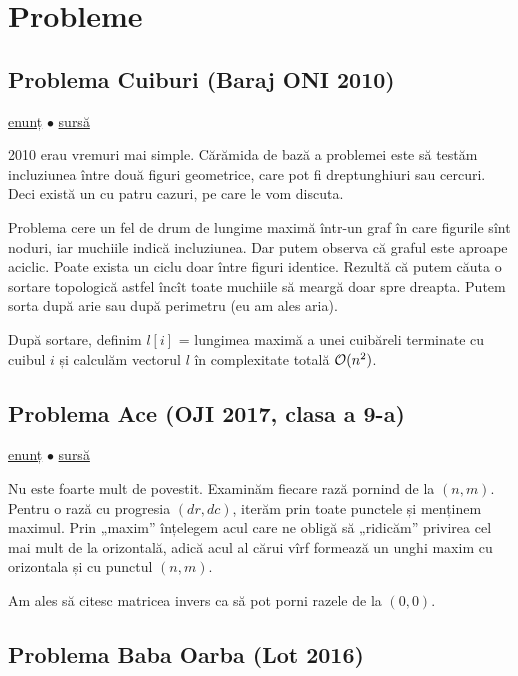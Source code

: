 \documentclass[../main.tex]{subfiles}
\begin{document}
\section{Probleme}

\subsection{Problema Cuiburi (Baraj ONI 2010)}
\label{problem:cuiburi}

\href{https://kilonova.ro/problems/1775}{enunț}
$\bullet$
\hyperref[code:cuiburi]{sursă}

2010 erau vremuri mai simple.  Cărămida de bază a problemei este să testăm incluziunea între două figuri geometrice, care pot fi dreptunghiuri sau cercuri. Deci există un  cu patru cazuri, pe care le vom discuta.

Problema cere un fel de drum de lungime maximă într-un graf în care figurile sînt noduri, iar muchiile indică incluziunea. Dar putem observa că graful este aproape aciclic. Poate exista un ciclu doar între figuri identice. Rezultă că putem căuta o sortare topologică astfel încît toate muchiile să meargă doar spre dreapta. Putem sorta după arie sau după perimetru (eu am ales aria).

După sortare, definim $l[i]$ = lungimea maximă a unei cuibăreli terminate cu cuibul $i$ și calculăm vectorul $l$ în complexitate totală $\mathcal{O}(n^2)$.

\subsection{Problema Ace (OJI 2017, clasa a 9-a)}
\label{problem:ace}

\href{https://kilonova.ro/problems/876}{enunț}
$\bullet$
\hyperref[code:ace]{sursă}

Nu este foarte mult de povestit. Examinăm fiecare rază pornind de la $(n,m)$. Pentru o rază cu progresia $(dr, dc)$, iterăm prin toate punctele și menținem maximul. Prin „maxim” înțelegem acul care ne obligă să „ridicăm” privirea cel mai mult de la orizontală, adică acul al cărui vîrf formează un unghi maxim cu orizontala și cu punctul $(n,m)$.

Am ales să citesc matricea invers ca să pot porni razele de la $(0,0)$.

\subsection{Problema Baba Oarba (Lot 2016)}
\label{problem:babaoarba}
\end{document}
